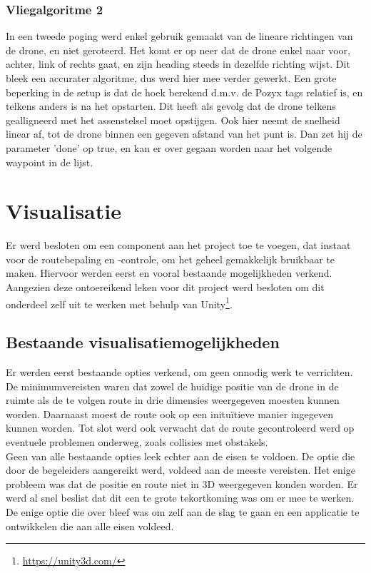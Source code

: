 \subsubsection{Vliegalgoritme 2}
In een tweede poging werd enkel gebruik gemaakt van de lineare richtingen van de drone, en niet geroteerd. Het komt er op neer dat de drone enkel naar voor, achter, link of rechts gaat, en zijn heading steeds in dezelfde richting wijst. Dit bleek een accurater algoritme, dus werd hier mee verder gewerkt. Een grote beperking in de setup is dat de hoek berekend d.m.v. de Pozyx tags relatief is, en telkens anders is na het opstarten. Dit heeft als gevolg dat de drone telkens gealligneerd met het assenstelsel moet opstijgen. Ook hier neemt de
snelheid linear af, tot de drone binnen een gegeven afstand van het punt is. Dan zet hij de
parameter ’done’ op true, en kan er over gegaan worden naar het volgende waypoint in de
lijst.
\section{Visualisatie} \label{sec:visualization}
Er werd besloten om een component aan het project toe te voegen, dat instaat voor de routebepaling en -controle, om het geheel gemakkelijk bruikbaar te maken.
Hiervoor werden eerst en vooral bestaande mogelijkheden verkend.
Aangezien deze ontoereikend leken voor dit project werd besloten om dit onderdeel zelf uit te werken met behulp van Unity\footnote{\url{https://unity3d.com/}}.

\subsection{Bestaande visualisatiemogelijkheden} \label{sec:opties}
Er werden eerst bestaande opties verkend, om geen onnodig werk te verrichten. De minimumvereisten waren dat zowel de huidige positie van de drone in de ruimte als de te volgen route in drie dimensies weergegeven moesten kunnen worden. Daarnaast moest de route ook op een initu\"itieve manier ingegeven kunnen worden. Tot slot werd ook verwacht dat de route gecontroleerd werd op eventuele problemen onderweg, zoals collisies met obstakels.\\

Geen van alle bestaande opties leek echter aan de eisen te voldoen. De optie die door de begeleiders aangereikt werd, voldeed aan de meeste vereisten. Het enige probleem was dat de positie en route niet in 3D weergegeven konden worden. Er werd al snel beslist dat dit een te grote tekortkoming was om er mee te werken. De enige optie die over bleef was om zelf aan de slag te gaan en een applicatie te ontwikkelen die aan alle eisen voldeed.

